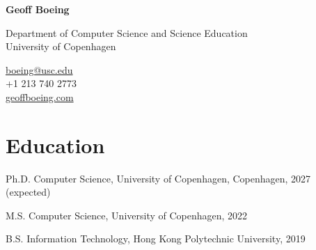 \documentclass[11pt,letterpaper]{report}
\newcommand{\myname}{Geoff Boeing}
\newcommand{\namefont}[1]{{\normalfont\bfseries\Huge{#1}}}
\begin{document}
    \raggedright{}

    \namefont{\myname}

    \vspace{1em}
    \begin{minipage}[t]{0.700\textwidth}
        Department of Computer Science and Science Education\\
        University of Copenhagen
    \end{minipage}
    \begin{minipage}[t]{0.295\textwidth}
        \flushright{}
        \href{mailto:boeing@usc.edu}{boeing@usc.edu} \\
        +1 213 740 2773 \\
        \href{https://geoffboeing.com}{geoffboeing.com}
    \end{minipage}


    \section*{Education}

    \begin{tablist}

        \item[Ph.D.] \tab{}Computer Science, University of Copenhagen, Copenhagen, 2027 (expected)
        \item[M.S.]  \tab{}Computer Science, University of Copenhagen, 2022
        \item[B.S.]  \tab{}Information Technology, Hong Kong Polytechnic University, 2019

    \end{tablist}
\end{document}
